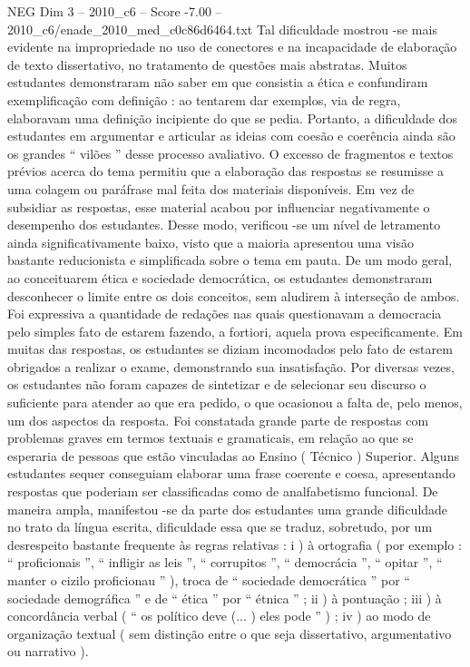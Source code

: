 \begin{textsample}{NEG Dim 3 – 2010\_c6 – Score -7.00 – 2010\_c6/enade\_2010\_med\_c0c86d6464.txt}
Tal dificuldade mostrou -se mais evidente na impropriedade no uso de conectores e na incapacidade de elaboração de texto dissertativo, no tratamento de questões mais abstratas.
Muitos estudantes demonstraram não saber em que consistia a ética e confundiram exemplificação com definição : ao tentarem dar exemplos, via de regra, elaboravam uma definição incipiente do que se pedia.
Portanto, a dificuldade dos estudantes em argumentar e articular as ideias com coesão e coerência ainda são os grandes “ vilões ” desse processo avaliativo.
O excesso de fragmentos e textos prévios acerca do tema permitiu que a elaboração das respostas se resumisse a uma colagem ou paráfrase mal feita dos materiais disponíveis.
Em vez de subsidiar as respostas, esse material acabou por influenciar negativamente o desempenho dos estudantes.
Desse modo, verificou -se um nível de letramento ainda significativamente baixo, visto que a maioria apresentou uma visão bastante reducionista e simplificada sobre o tema em pauta.
De um modo geral, ao conceituarem ética e sociedade democrática, os estudantes demonstraram desconhecer o limite entre os dois conceitos, sem aludirem à interseção de ambos.
Foi expressiva a quantidade de redações nas quais questionavam a democracia pelo simples fato de estarem fazendo, a fortiori, aquela prova especificamente.
Em muitas das respostas, os estudantes se diziam incomodados pelo fato de estarem obrigados a realizar o exame, demonstrando sua insatisfação.
Por diversas vezes, os estudantes não foram capazes de sintetizar e de selecionar seu discurso o suficiente para atender ao que era pedido, o que ocasionou a falta de, pelo menos, um dos aspectos da resposta.
Foi constatada grande parte de respostas com problemas graves em termos textuais e gramaticais, em relação ao que se esperaria de pessoas que estão vinculadas ao Ensino ( Técnico ) Superior.
Alguns estudantes sequer conseguiam elaborar uma frase coerente e coesa, apresentando respostas que poderiam ser classificadas como de analfabetismo funcional.
De maneira ampla, manifestou -se da parte dos estudantes uma grande dificuldade no trato da língua escrita, dificuldade essa que se traduz, sobretudo, por um desrespeito bastante frequente às regras relativas : i ) à ortografia ( por exemplo : “ proficionais ”, “ infligir as leis ”, “ corrupitos ”, “ democrácia ”, “ opitar ”, “ manter o cizilo proficionau ” ), troca de “ sociedade democrática ” por “ sociedade demográfica ” e de “ ética ” por “ étnica ” ; ii ) à pontuação ; iii ) à concordância verbal ( “ os político deve (... ) eles pode ” ) ; iv ) ao modo de organização textual ( sem distinção entre o que seja dissertativo, argumentativo ou narrativo ).

\end{textsample}
